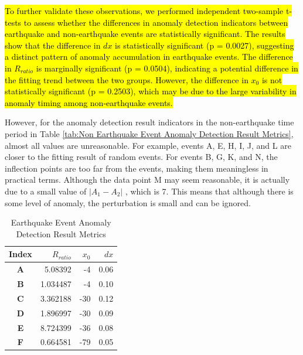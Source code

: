 \documentclass[3p,authoryear,preprint,12pt]{elsarticle}
\begin{document}
\hl{To further validate these observations, we performed independent two-sample t-tests to assess whether the differences in anomaly detection indicators between earthquake and non-earthquake events are statistically significant. The results show that the difference in $dx$ is statistically significant (p = 0.0027), suggesting a distinct pattern of anomaly accumulation in earthquake events. The difference in $R_{ratio}$ is marginally significant (p = 0.0504), indicating a potential difference in the fitting trend between the two groups. However, the difference in $x_0$ is not statistically significant (p = 0.2503), which may be due to the large variability in anomaly timing among non-earthquake events.}

{However, for the anomaly detection result indicators} in the non-earthquake time period in Table \ref{tab:Non Earthquake Event Anomaly Detection Result Metrics}, almost all values are unreasonable. For example, events A, E, H, I, J, and L are closer to the fitting result of random events. For events B, G, K, and N, the inflection points are too far from the events, making them meaningless in practical terms. Although the data point M may seem reasonable, it is actually due to a small value of $\vert A_1 - A_2 \vert$ , which is 7. This means that although there is some level of anomaly, the perturbation is small and can be ignored.
\begin{table}[htbp]
	\caption{Earthquake Event Anomaly Detection Result Metrics}
	\label{tab:Earthquake Event Anomaly Detection Result Metrics}
	\centering
	\begin{tabular}{crrr}
		\toprule
		\textbf{Index}& $R_{ratio}$ & $x_0$       & $dx$    \\
		\midrule
		\textbf{A} & 5.08392     & -4     & 0.06 \\
		\textbf{B} & 1.034487    & -4     & 0.10 \\
		\textbf{C} & 3.362188    & -30    & 0.12 \\
		\textbf{D} & 1.896997    & -30    & 0.09 \\
		\textbf{E} & 8.724399    & -36    & 0.08 \\
		\textbf{F} & 0.664581    & -79    & 0.05 \\
		\bottomrule
	\end{tabular}
\end{table}
\end{document}
